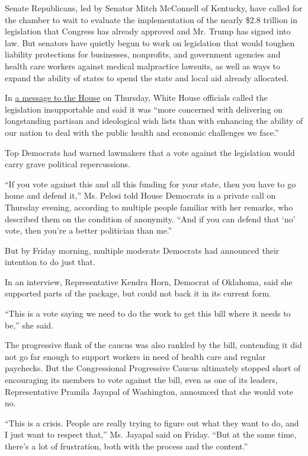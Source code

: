 Senate Republicans, led by Senator Mitch McConnell of Kentucky, have
called for the chamber to wait to evaluate the implementation of the
nearly \$2.8 trillion in legislation that Congress has already approved
and Mr. Trump has signed into law. But senators have quietly begun to
work on legislation that would toughen liability protections for
businesses, nonprofits, and government agencies and health care workers
against medical malpractice lawsuits, as well as ways to expand the
ability of states to spend the state and local aid already allocated.

In
\href{https://www.whitehouse.gov/wp-content/uploads/2020/05/SAP_H.R.-6800.pdf}{a
message to the House} on Thursday, White House officials called the
legislation insupportable and said it was ``more concerned with
delivering on longstanding partisan and ideological wish lists than with
enhancing the ability of our nation to deal with the public health and
economic challenges we face.''

Top Democrats had warned lawmakers that a vote against the legislation
would carry grave political repercussions.

``If you vote against this and all this funding for your state, then you
have to go home and defend it,'' Ms. Pelosi told House Democrats in a
private call on Thursday evening, according to multiple people familiar
with her remarks, who described them on the condition of anonymity.
``And if you can defend that `no' vote, then you're a better politician
than me.''

But by Friday morning, multiple moderate Democrats had announced their
intention to do just that.

In an interview, Representative Kendra Horn, Democrat of Oklahoma, said
she supported parts of the package, but could not back it in its current
form.

``This is a vote saying we need to do the work to get this bill where it
needs to be,'' she said.

The progressive flank of the caucus was also rankled by the bill,
contending it did not go far enough to support workers in need of health
care and regular paychecks. But the Congressional Progressive Caucus
ultimately stopped short of encouraging its members to vote against the
bill, even as one of its leaders, Representative Pramila Jayapal of
Washington, announced that she would vote no.

``This is a crisis. People are really trying to figure out what they
want to do, and I just want to respect that,'' Ms. Jayapal said on
Friday. ``But at the same time, there's a lot of frustration, both with
the process and the content.''

